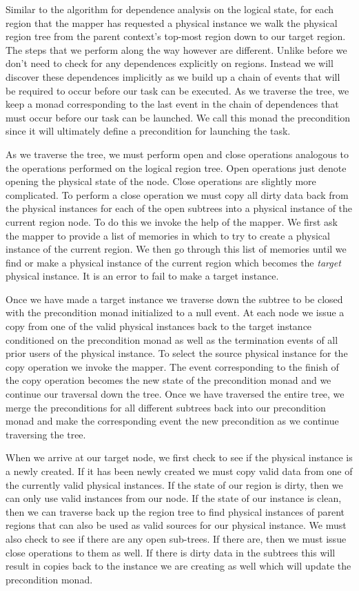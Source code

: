 Similar to the algorithm for dependence analysis on the logical state, for each region that the 
mapper has requested a physical instance we walk the physical region tree from the parent context's 
top-most region down to our target region.  The steps that we perform along the way however are 
different.  Unlike before we don't need to check for any dependences explicitly on regions.  Instead 
we will discover these dependences implicitly as we build up a chain of events that will be required 
to occur before our task can be executed.  As we traverse the tree, we keep a monad corresponding to 
the last event in the chain of dependences that must occur before our task can be launched.  We call
this monad the precondition since it will ultimately define a precondition for launching the task.

As we traverse the tree, we must perform open and close operations analogous to the operations 
performed on the logical region tree.  Open operations just denote opening the physical state 
of the node.  Close operations are slightly more complicated.  To perform a close operation we must 
copy all dirty data back from the physical instances for each of the open subtrees into a physical 
instance of the current region node.  To do this we invoke the help of the mapper.  We first ask the mapper 
to provide a list of memories in which to try to create a physical instance of the current region.  We 
then go through this list of memories until we find or make a physical instance of the current region which
becomes the {\em target} physical instance.  It is an error to fail to make a target instance.

Once we have made a target instance we traverse down the subtree to be closed with the precondition monad
initialized to a null event.  At each node we issue a copy from one of the valid physical instances back
to the target instance conditioned on the precondition monad as well as the termination events of all prior
users of the physical instance.  To select the source physical instance for the copy operation we invoke
the mapper.  The event corresponding to the finish of the copy operation becomes the new state of the
precondition monad and we continue our traversal down the tree.  Once we have traversed the entire tree,
we merge the preconditions for all different subtrees back into our precondition monad and make the corresponding
event the new precondition as we continue traversing the tree.

When we arrive at our target node, we first check to see if the physical instance is a newly created.  If
it has been newly created we must copy valid data from one of the currently valid physical instances.  If the
state of our region is dirty, then we can only use valid instances from our node.  If the state of our instance
is clean, then we can traverse back up the region tree to find physical instances of parent regions that can
also be used as valid sources for our physical instance.  We must also check to see if there are any open sub-trees.  
If there are, then we must issue close operations to them as well.  If there is dirty data in the subtrees this
will result in copies back to the instance we are creating as well which will update the precondition monad.


